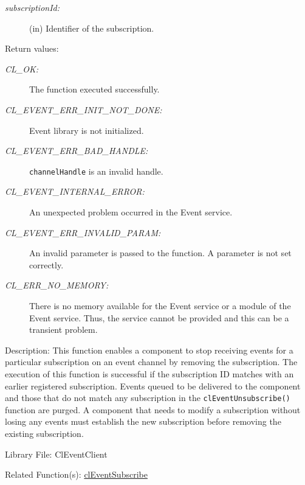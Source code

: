 \begin{flushleft}
\begin{Desc}
\begin{description}
\item[{\em subscription\-Id:}](in) Identifier of the subscription.\end{description}
\end{Desc}
\begin{Desc}
\item[Return values:]
\begin{description}
\item[{\em CL\_\-OK:}]The function executed successfully. 
\item[{\em CL\_\-EVENT\_\-ERR\_\-INIT\_\-NOT\_\-DONE:}]Event library is not initialized. 
\item[{\em CL\_\-EVENT\_\-ERR\_\-BAD\_\-HANDLE:}]{\tt{channelHandle}} is an invalid handle. 
\item[{\em CL\_\-EVENT\_\-INTERNAL\_\-ERROR:}]An unexpected problem occurred in the Event service. 
\item[{\em CL\_\-EVENT\_\-ERR\_\-INVALID\_\-PARAM:}]An invalid parameter is passed to the function. A parameter is not set correctly.
\item[{\em CL\_\-ERR\_\-NO\_\-MEMORY:}]There is no memory available for the Event service or a module of the Event service. Thus, the service cannot be 
provided and this can be a transient problem.

\end{description}
\end{Desc}
\begin{Desc}
\item[Description:]
This function enables a component to stop receiving events for a particular subscription on an event channel by removing the 
subscription. The execution of this function is successful if the subscription ID matches with an earlier registered subscription. 
Events queued to be delivered to the component and those that do not match any subscription in the {\tt{clEventUnsubscribe()}} function are purged. A 
component that needs to modify a subscription without losing any events must establish the new subscription before removing the existing
subscription. 
\end{Desc}
\begin{Desc}
\item[Library File:]Cl\-Event\-Client\end{Desc}
\begin{Desc}
\item[Related Function(s):]\hyperlink{pageem114}{cl\-Event\-Subscribe} \end{Desc}
\newpage



\end{flushleft}
